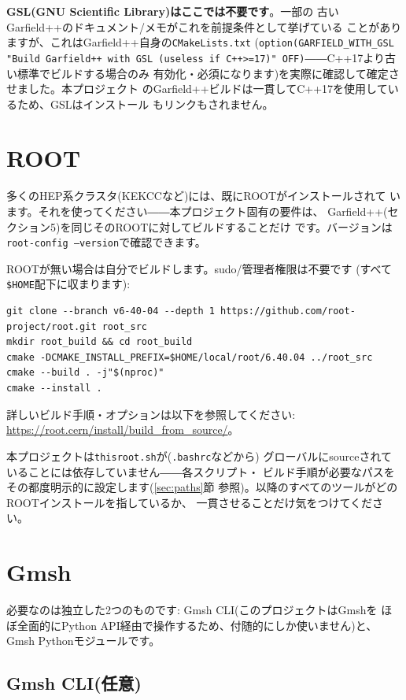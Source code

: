 \documentclass[11pt]{ltjsarticle}
\begin{document}
\textbf{GSL(GNU Scientific Library)はここでは不要です}。一部の
古いGarfield++のドキュメント/メモがこれを前提条件として挙げている
ことがありますが、これはGarfield++自身の\texttt{CMakeLists.txt}
(\texttt{option(GARFIELD\_WITH\_GSL "Build Garfield++ with GSL
(useless if C++>=17)" OFF)}――C++17より古い標準でビルドする場合のみ
有効化・必須になります)を実際に確認して確定させました。本プロジェクト
のGarfield++ビルドは一貫してC++17を使用しているため、GSLはインストール
もリンクもされません。

\section{ROOT}

多くのHEP系クラスタ(KEKCCなど)には、既にROOTがインストールされて
います。それを使ってください――本プロジェクト固有の要件は、
Garfield++(セクション5)を同じそのROOTに対してビルドすることだけ
です。バージョンは\texttt{root-config --version}で確認できます。

ROOTが無い場合は自分でビルドします。sudo/管理者権限は不要です
(すべて\texttt{\$HOME}配下に収まります):

\begin{lstlisting}
git clone --branch v6-40-04 --depth 1 https://github.com/root-project/root.git root_src
mkdir root_build && cd root_build
cmake -DCMAKE_INSTALL_PREFIX=$HOME/local/root/6.40.04 ../root_src
cmake --build . -j"$(nproc)"
cmake --install .
\end{lstlisting}

詳しいビルド手順・オプションは以下を参照してください:
\url{https://root.cern/install/build_from_source/}。

本プロジェクトは\texttt{thisroot.sh}が(\texttt{.bashrc}などから)
グローバルにsourceされていることには依存していません――各スクリプト・
ビルド手順が必要なパスをその都度明示的に設定します(\ref{sec:paths}節
参照)。以降のすべてのツールがどのROOTインストールを指しているか、
一貫させることだけ気をつけてください。

\section{Gmsh}

必要なのは独立した2つのものです: Gmsh CLI(このプロジェクトはGmshを
ほぼ全面的にPython API経由で操作するため、付随的にしか使いません)と、
Gmsh Pythonモジュールです。

\subsection{Gmsh CLI(任意)}
\end{document}
